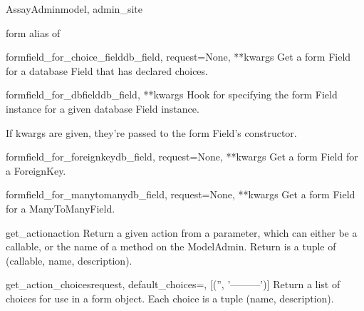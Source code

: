 \documentclass[letterpaper,10pt,english]{sphinxmanual}
\begin{document}
\begin{classdesc}{AssayAdmin}{model, admin\_site}
\hypertarget{data.admin.AssayAdmin.form}{}\begin{memberdesc}{form}
alias of 
\end{memberdesc}

\hypertarget{data.admin.AssayAdmin.formfield_for_choice_field}{}\begin{methoddesc}{formfield\_for\_choice\_field}{db\_field, request=None, **kwargs}
Get a form Field for a database Field that has declared choices.
\end{methoddesc}

\hypertarget{data.admin.AssayAdmin.formfield_for_dbfield}{}\begin{methoddesc}{formfield\_for\_dbfield}{db\_field, **kwargs}
Hook for specifying the form Field instance for a given database Field
instance.

If kwargs are given, they're passed to the form Field's constructor.
\end{methoddesc}

\hypertarget{data.admin.AssayAdmin.formfield_for_foreignkey}{}\begin{methoddesc}{formfield\_for\_foreignkey}{db\_field, request=None, **kwargs}
Get a form Field for a ForeignKey.
\end{methoddesc}

\hypertarget{data.admin.AssayAdmin.formfield_for_manytomany}{}\begin{methoddesc}{formfield\_for\_manytomany}{db\_field, request=None, **kwargs}
Get a form Field for a ManyToManyField.
\end{methoddesc}

\hypertarget{data.admin.AssayAdmin.get_action}{}\begin{methoddesc}{get\_action}{action}
Return a given action from a parameter, which can either be a callable,
or the name of a method on the ModelAdmin.  Return is a tuple of
(callable, name, description).
\end{methoddesc}

\hypertarget{data.admin.AssayAdmin.get_action_choices}{}\begin{methoddesc}{get\_action\_choices}{request, default\_choices=, {[}('', '---------'){]}}
Return a list of choices for use in a form object.  Each choice is a
tuple (name, description).
\end{methoddesc}


\end{classdesc}
\end{document}
